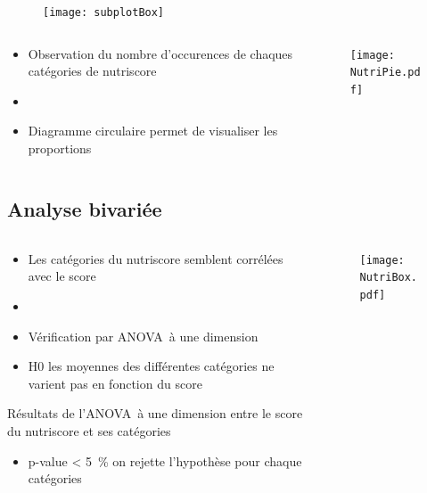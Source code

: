 \begin{frame}{\insertsubsection}
  \begin{figure}
    \texttt{[image: subplotBox]}
  \end{figure}
\end{frame}

\begin{frame}{\insertsubsection}
  \begin{columns}
    \begin{column}{.5\textwidth}
      \begin{itemize}
        \item Observation du nombre d'occurences de chaques catégories de nutriscore
        \item[]
        \item Diagramme circulaire permet de visualiser les proportions
      \end{itemize}
    \end{column}
    \begin{column}{.5\textwidth}
      \begin{figure}
        \texttt{[image: NutriPie.pdf]}
      \end{figure}
    \end{column}
  \end{columns}
\end{frame}

\subsection{Analyse bivariée}
\begin{frame}{\insertsubsection}
  \begin{columns}
    \begin{column}{.55\textwidth}
      \begin{itemize}
        \item Les catégories du nutriscore semblent corrélées avec le score
        \item[]
        \item Vérification par ANOVA à une dimension
        \item H0 les moyennes des différentes catégories ne varient pas en fonction du score
      \end{itemize}
      \begin{table}
        \tiny
        
        \caption{Résultats de l'ANOVA à une dimension entre le score du nutriscore et ses catégories}
      \end{table}
      \begin{itemize}
        \item p-value \qty{< 5}{\percent} on rejette l'hypothèse pour chaque catégories
      \end{itemize}
    \end{column}
    \begin{column}{.45\textwidth}
      \begin{figure}
        \texttt{[image: NutriBox.pdf]}
      \end{figure}
    \end{column}
  \end{columns}
\end{frame}

